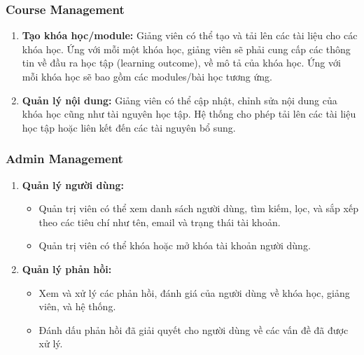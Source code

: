 \subsubsection{Course Management}
\begin{enumerate}
    \item \textbf{Tạo khóa học/module:} Giảng viên có thể tạo và tải lên các tài liệu cho các khóa học. Ứng với mỗi một khóa học, giảng viên sẽ phải cung cấp các thông tin về đầu ra học tập (learning outcome), về mô tả của khóa học. Ứng với mỗi khóa học sẽ bao gồm các modules/bài học tương ứng.
\item \textbf{Quản lý nội dung:} Giảng viên có thể cập nhật, chỉnh sửa nội dung của khóa học cũng như tài nguyên học tập. Hệ thống cho phép tải lên các tài liệu học tập hoặc liên kết đến các tài nguyên bổ sung.
\end{enumerate}
\subsubsection{Admin Management}
\begin{enumerate}
    \item \textbf{Quản lý người dùng:} 
    \begin{itemize}
        \item Quản trị viên có thể xem danh sách người dùng, tìm kiếm, lọc, và sắp xếp theo các tiêu chí như tên, email và trạng thái tài khoản.
        \item Quản trị viên có thể khóa hoặc mở khóa tài khoản người dùng.
    \end{itemize}
\item \textbf{Quản lý phản hồi:}
\begin{itemize}
    \item Xem và xử lý các phản hồi, đánh giá của người dùng về khóa học, giảng viên, và hệ thống.
    \item Đánh dấu phản hồi đã giải quyết cho người dùng về các vấn đề đã được xử lý.
\end{itemize}
\end{enumerate}
